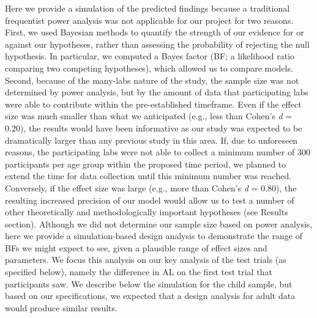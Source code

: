 \documentclass[
  man,floatsintext]{apa6}
\begin{document}
Here we provide a simulation of the predicted findings because a traditional frequentist power analysis was not applicable for our project for two reasons. First, we used Bayesian methods to quantify the strength of our evidence for or against our hypotheses, rather than assessing the probability of rejecting the null hypothesis. In particular, we computed a Bayes factor (BF; a likelihood ratio comparing two competing hypotheses), which allowed us to compare models. Second, because of the many-labs nature of the study, the sample size was not determined by power analysis, but by the amount of data that participating labs were able to contribute within the pre-established timeframe. Even if the effect size was much smaller than what we anticipated (e.g., less than Cohen's \emph{d} = 0.20), the results would have been informative as our study was expected to be dramatically larger than any previous study in this area. If, due to unforeseen reasons, the participating labs were not able to collect a minimum number of 300 participants per age group within the proposed time period, we planned to extend the time for data collection until this minimum number was reached. Conversely, if the effect size was large (e.g., more than Cohen's \emph{d} = 0.80), the resulting increased precision of our model would allow us to test a number of other theoretically and methodologically important hypotheses (see Results section).
Although we did not determine our sample size based on power analysis, here we provide a simulation-based design analysis to demonstrate the range of BFs we might expect to see, given a plausible range of effect sizes and parameters. We focus this analysis on our key analysis of the test trials (as specified below), namely the difference in AL on the first test trial that participants saw. We describe below the simulation for the child sample, but based on our specifications, we expected that a design analysis for adult data would produce similar results.
\end{document}
